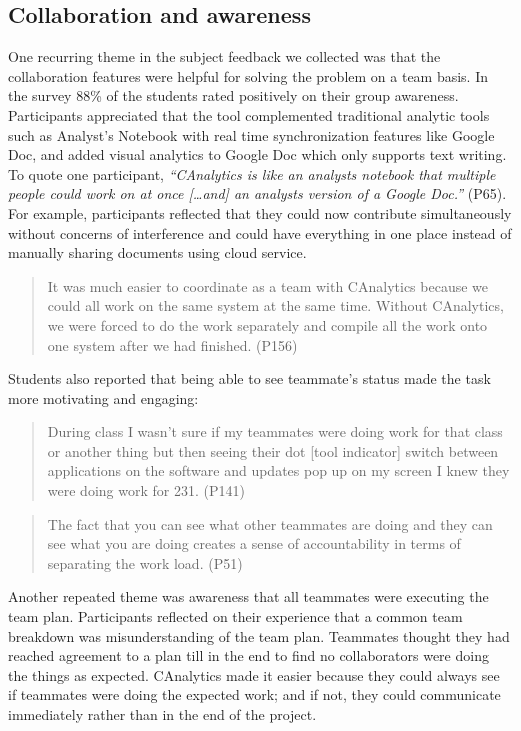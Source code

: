 \subsection{Collaboration and
awareness}\label{collaboration-and-awareness}

One recurring theme in the subject feedback we collected was that the
collaboration features were helpful for solving the problem on a team
basis. In the survey 88\% of the students rated positively on their
group awareness. Participants appreciated that the tool complemented
traditional analytic tools such as Analyst's Notebook with real time
synchronization features like Google Doc, and added visual analytics to
Google Doc which only supports text writing. To quote one participant,
\emph{``CAnalytics is like an analysts notebook that multiple people
could work on at once {[}\ldots{}and{]} an analysts version of a Google
Doc.''} (P65). For example, participants reflected that they could now
contribute simultaneously without concerns of interference and could
have everything in one place instead of manually sharing documents using
cloud service.

\begin{quote}
It was much easier to coordinate as a team with CAnalytics because we
could all work on the same system at the same time. Without CAnalytics,
we were forced to do the work separately and compile all the work onto
one system after we had finished. (P156)
\end{quote}

Students also reported that being able to see teammate's status made the
task more motivating and engaging:

\begin{quote}
During class I wasn't sure if my teammates were doing work for that
class or another thing but then seeing their dot {[}tool indicator{]}
switch between applications on the software and updates pop up on my
screen I knew they were doing work for 231. (P141)
\end{quote}

\begin{quote}
The fact that you can see what other teammates are doing and they can
see what you are doing creates a sense of accountability in terms of
separating the work load. (P51)
\end{quote}

Another repeated theme was awareness that all teammates were executing
the team plan. Participants reflected on their experience that a common
team breakdown was misunderstanding of the team plan. Teammates thought
they had reached agreement to a plan till in the end to find no
collaborators were doing the things as expected. CAnalytics made it
easier because they could always see if teammates were doing the
expected work; and if not, they could communicate immediately rather
than in the end of the project.

